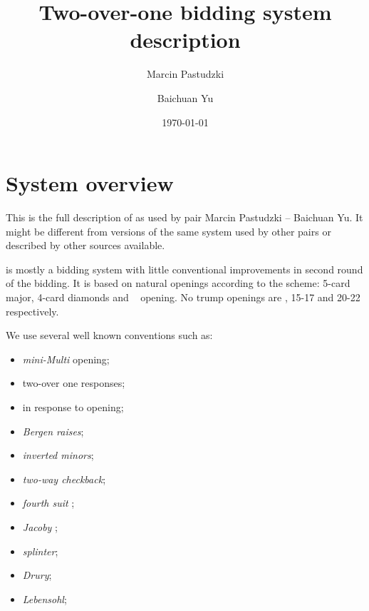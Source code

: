 \documentclass[12pt,a4paper,twoside]{book}
\title{Two-over-one bidding system description}
\author{Marcin Pastudzki \and Baichuan Yu}
\date{\today}
\begin{document}
\maketitle
\tableofcontents

\chapter{System overview}

This is the full description of \system\/ as used by pair Marcin Pastudzki -- Baichuan Yu. It might be different from
versions of the same system used by other pairs or described by other sources available.

\system\/ is mostly a \nat\/ bidding system with little conventional improvements in second round of the bidding.
It is based on natural openings according to the scheme: 5-card major, 4-card diamonds and \snat\  opening.
No trump openings are \nat, 15-17 and 20-22 respectively.

We use several well known conventions such as:
\begin{itemize}
  \item \emph{mini-Multi} \art\/ opening;
  \item \gf\/ two-over one responses;
  \item \force\/  in response to  opening;
  \item \emph{Bergen raises};
  \item \emph{inverted minors};
  \item \emph{two-way checkback};
  \item \emph{fourth suit} \gf\/;
  \item \emph{Jacoby} ;
  \item \emph{splinter}\/;
  \item \emph{Drury}\/;
  \item \emph{Lebensohl}\/;
\end{itemize}
\end{document}

